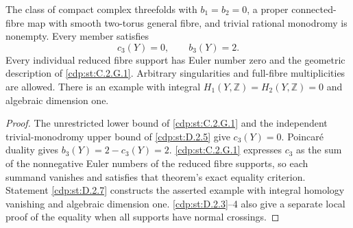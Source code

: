 
\begin{proposition}\label{cdp:st:D.2.2}
The class of compact complex threefolds with $b_1=b_2=0$,
a proper connected-fibre map with smooth two-torus general fibre,
and trivial rational monodromy is nonempty. Every member satisfies
\[
                   c_3(Y)=0,\qquad b_3(Y)=2.
\]
Every individual reduced fibre support has Euler number zero and
the geometric description of \ref{cdp:st:C.2.G.1}. Arbitrary singularities and
full-fibre multiplicities are allowed. There is an example with
integral $H_1(Y,\mathbb Z)=H_2(Y,\mathbb Z)=0$ and
algebraic dimension one.
\end{proposition}
\begin{proof}
The unrestricted lower bound of \ref{cdp:st:C.2.G.1} and the independent
trivial-monodromy upper bound of \ref{cdp:st:D.2.5} give $c_3(Y)=0$.
Poincar\'e duality gives $b_3(Y)=2-c_3(Y)=2$.
\ref{cdp:st:C.2.G.1} expresses $c_3$ as the sum of the nonnegative
Euler numbers of the reduced fibre supports, so each summand
vanishes and satisfies that theorem's exact equality criterion.
Statement \ref{cdp:st:D.2.7} constructs the asserted example with integral
homology vanishing and algebraic dimension one. \ref{cdp:st:D.2.3}--4 also
give a separate local proof of the equality when all supports
have normal crossings.
\end{proof}


